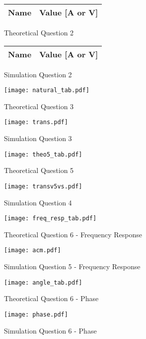 \vspace{0.1cm}
\begin{figure}[H]
      \centering
      \begin{tabular}{ | c | c | }
      \hline    
      {\bf Name} & {\bf Value [A or V]} \\ \hline
      
      \hline
      \end{tabular}
      \caption{Theoretical Question 2}
    \endminipage\hfill
      \centering
      \begin{tabular}{ | c | c | }
      \hline    
      {\bf Name} & {\bf Value [A or V]} \\ \hline
      
      \end{tabular}
      \caption{Simulation Question 2}
    \endminipage\hfill
\end{figure}
\vspace{0.1cm}
\begin{figure}[H]
      \texttt{[image: natural\_tab.pdf]}
      \caption{Theoretical Question 3}
    \endminipage\hfill
      \texttt{[image: trans.pdf]}
      \caption{Simulation Question 3}
    \endminipage\hfill
\end{figure}
\vspace{0.1cm}
\begin{figure}[H]
      \texttt{[image: theo5\_tab.pdf]}
      \caption{Theoretical Question 5}
    \endminipage\hfill
      \texttt{[image: transv5vs.pdf]}
      \caption{Simulation Question 4}
    \endminipage\hfill
\end{figure}
\vspace{0.1cm}
\begin{figure}[H]
      \texttt{[image: freq\_resp\_tab.pdf]}
      \caption{Theoretical Question 6 - Frequency Response}
    \endminipage\hfill
      \texttt{[image: acm.pdf]}
      \caption{Simulation Question 5 - Frequency Response}
    \endminipage\hfill
\end{figure}
\vspace{0.1cm}

\begin{figure}[H]
      \texttt{[image: angle\_tab.pdf]}
      \caption{Theoretical Question 6 - Phase}
    \endminipage\hfill
      \texttt{[image: phase.pdf]}
      \caption{Simulation Question 6 - Phase}
    \endminipage\hfill
\end{figure}
